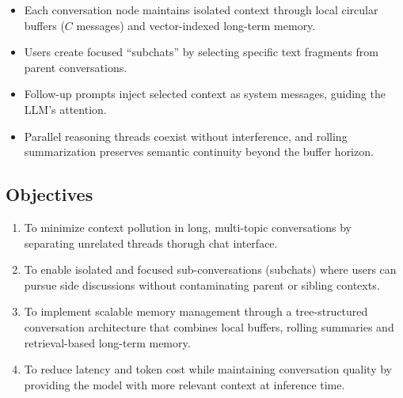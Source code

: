 \documentclass[pdflatex,sn-mathphys-num]{sn-jnl}%
\theoremstyle{thmstyleone}%
\theoremstyle{thmstyletwo}%
\theoremstyle{thmstylethree}%
\begin{document}
\begin{itemize}
    \item Each conversation node maintains isolated context through local circular buffers ($C$ messages) and vector-indexed long-term memory.
    \item Users create focused ``subchats'' by selecting specific text fragments from parent conversations.
    \item Follow-up prompts inject selected context as system messages, guiding the LLM's attention.
    \item Parallel reasoning threads coexist without interference, and rolling summarization preserves semantic continuity beyond the buffer horizon.
\end{itemize}

\subsection{Objectives}\label{subsec:objectives}

\begin{enumerate}
    \item To minimize context pollution in long, multi-topic conversations by separating unrelated threads thorugh chat interface.



    \item To enable isolated and focused sub-conversations (subchats) where users can pursue side discussions without contaminating parent or sibling contexts.
    \item To implement scalable memory management through a tree-structured conversation architecture that combines local buffers, rolling summaries and retrieval-based long-term memory.
    
    
    \item To reduce latency and token cost while maintaining conversation quality by providing the model with more relevant context at inference time.

\end{enumerate}
\end{document}
